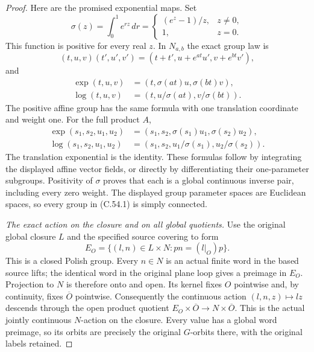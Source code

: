 \begin{proof}
Here are the promised exponential maps.
Set
\[
 \sigma(z)=\int_0^1 e^{rz}\,dr
   =
   \begin{cases}(e^z-1)/z,&z\ne0,\\1,&z=0.\end{cases}
                                                               \tag{C.54.9}
\]
This function is positive for every real
$z$. In $N_{a,b}$ the exact group law is
\[
 (t,u,v)(t',u',v')
     =(t+t',u+e^{at}u',v+e^{bt}v'),
                                                               \tag{C.54.10}
\]
and
\[
 \begin{split}
 \exp(t,u,v)&=(t,\sigma(at)u,\sigma(bt)v),\\
 \log(t,u,v)&=(t,u/\sigma(at),v/\sigma(bt)).
 \end{split}                                             \tag{C.54.11}
\]
The positive affine group has the same
formula with one translation coordinate
and weight one. For the full product $A$,
\[
 \begin{split}
 \exp(s_1,s_2,u_1,u_2)
      &=(s_1,s_2,\sigma(s_1)u_1,\sigma(s_2)u_2),\\
 \log(s_1,s_2,u_1,u_2)
      &=(s_1,s_2,u_1/\sigma(s_1),u_2/\sigma(s_2)).
 \end{split}                                             \tag{C.54.12}
\]
The translation exponential is the identity.
These formulas follow by integrating the
displayed affine vector fields, or directly
by differentiating their one-parameter
subgroups. Positivity of $\sigma$ proves
that each is a global continuous inverse
pair, including every zero weight.
The displayed group parameter spaces are
Euclidean spaces, so every group in
(C.54.1) is simply connected.

\emph{The exact action on the closure and on all global quotients.}
Use the original global closure $L$ and
the specified source covering to form
\[
 E_O=\{(l,n)\in L\times N:pn=(l|_O)p\}.
                                                               \tag{C.54.13}
\]
This is a closed Polish group.
Every $n\in N$ is an actual finite word
in the based source lifts; the identical
word in the original plane loop gives a
preimage in $E_O$. Projection to $N$ is
therefore onto and open.
Its kernel fixes $O$ pointwise and, by
continuity, fixes $\overline O$ pointwise.
Consequently the continuous action
$(l,n,z)\mapsto lz$ descends through the
open product quotient
$E_O\times\overline O\to N\times\overline O$.
This is the actual jointly continuous
$N$-action on the closure. Every value
has a global word preimage, so its orbits
are precisely the original $G$-orbits
there, with the original labels retained.


\end{proof}
